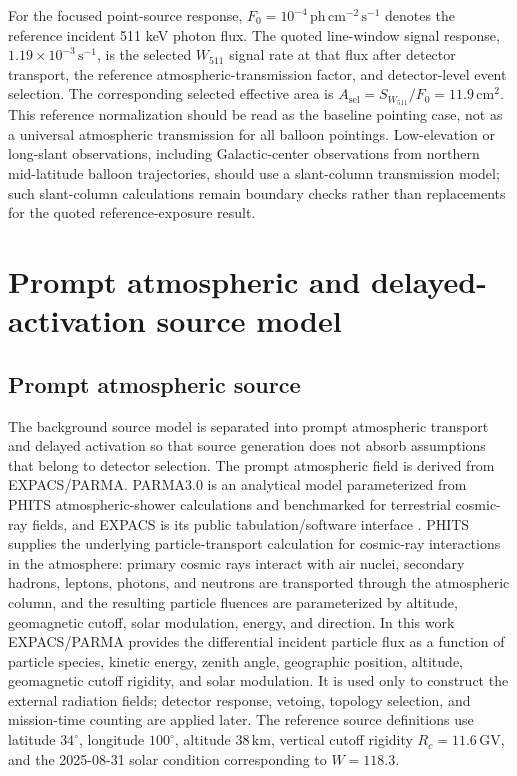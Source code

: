 \documentclass[preprint,12pt]{elsarticle}
\newcommand{\phcms}{\,\mathrm{ph\,cm^{-2}\,s^{-1}}}
\newcommand{\cps}{\,\mathrm{s^{-1}}}
\newcommand{\wii}{W_{511}}
\newcommand{\fzero}{F_{0}}
\begin{document}
For the focused point-source response, $\fzero=10^{-4}\phcms$ denotes the reference incident 511 keV photon flux. The quoted line-window signal response, $1.19\times10^{-3}\cps$, is the selected $\wii$ signal rate at that flux after detector transport, the reference atmospheric-transmission factor, and detector-level event selection. The corresponding selected effective area is $A_{\mathrm{sel}}=S_{\wii}/\fzero=11.9\,\mathrm{cm^2}$. This reference normalization should be read as the baseline pointing case, not as a universal atmospheric transmission for all balloon pointings. Low-elevation or long-slant observations, including Galactic-center observations from northern mid-latitude balloon trajectories, should use a slant-column transmission model; such slant-column calculations remain boundary checks rather than replacements for the quoted reference-exposure result.

\section{Prompt atmospheric and delayed-activation source model}
\label{sec:background}

\subsection{Prompt atmospheric source}
\label{subsec:prompt_source}

The background source model is separated into prompt atmospheric transport and delayed activation so that source generation does not absorb assumptions that belong to detector selection. The prompt atmospheric field is derived from EXPACS/PARMA. PARMA3.0 is an analytical model parameterized from PHITS atmospheric-shower calculations and benchmarked for terrestrial cosmic-ray fields, and EXPACS is its public tabulation/software interface \cite{Sato2015EXPACS,Sato2016PARMA4}. PHITS supplies the underlying particle-transport calculation for cosmic-ray interactions in the atmosphere: primary cosmic rays interact with air nuclei, secondary hadrons, leptons, photons, and neutrons are transported through the atmospheric column, and the resulting particle fluences are parameterized by altitude, geomagnetic cutoff, solar modulation, energy, and direction. In this work EXPACS/PARMA provides the differential incident particle flux as a function of particle species, kinetic energy, zenith angle, geographic position, altitude, geomagnetic cutoff rigidity, and solar modulation. It is used only to construct the external radiation fields; detector response, vetoing, topology selection, and mission-time counting are applied later. The reference source definitions use latitude $34^\circ$, longitude $100^\circ$, altitude $38\,\mathrm{km}$, vertical cutoff rigidity $R_c=11.6\,\mathrm{GV}$, and the 2025-08-31 solar condition corresponding to $W=118.3$.
\end{document}
